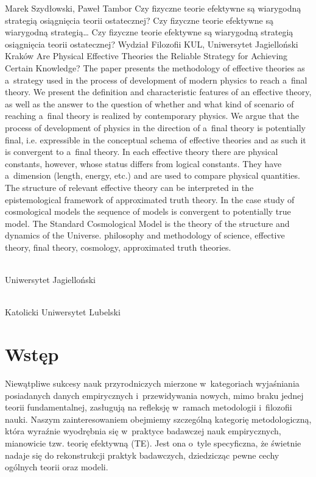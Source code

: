 \begin{artplenv2auth}{Marek Szydłowski, Paweł Tambor}
	{Czy fizyczne teorie efektywne są wiarygodną strategią osiągnięcia teorii ostatecznej?}
	{Czy fizyczne teorie efektywne są wiarygodną strategią\ldots}
	{Czy fizyczne teorie efektywne są wiarygodną strategią osiągnięcia teorii ostatecznej?}
	{Wydział Filozofii KUL, Uniwersytet Jagielloński Kraków}
	{Are Physical Effective Theories the Reliable Strategy for Achieving Certain Knowledge?}
	{The paper presents the methodology of effective theories as a~strategy used in the process of development of modern physics to reach a~final theory. We present the definition and characteristic features of an effective theory, as well as the answer to the question of whether and what kind of scenario of reaching a~final theory is realized by contemporary physics. We argue that the process of development of physics in the direction of a~final theory is potentially final, i.e. expressible in the conceptual schema of effective theories and as such it is convergent to a~final theory. In each effective theory there are physical constants, however, whose status differs from logical constants. They have a~dimension (length, energy, etc.) and are used to compare physical quantities. The structure of relevant effective theory can be interpreted in the epistemological framework of approximated truth theory. In the case study of cosmological models the sequence of models is convergent to potentially true model. The Standard Cosmological Model is the theory of the structure and dynamics of the Universe.}
	{philosophy and methodology of science, effective theory, final theory, cosmology, approximated truth theories.}
	{%
			{\flushright{}\\\subsubsectit\small{Uniwersytet Jagielloński}\par}%
			{\flushright{}\\\subsubsectit\small{Katolicki Uniwersytet Lubelski}\par}%
		}


\section{Wstęp}
\lettrine[loversize=0.13,lines=2,lraise=-0.04,nindent=0em,findent=0.2pt]%
{N}{}iewątpliwe sukcesy nauk przyrodniczych mierzone w~kategoriach wyjaśniania posiadanych danych empirycznych i~przewidywania nowych, mimo braku jednej teorii fundamentalnej, zasługują na refleksję w~ramach metodologii i~filozofii nauki. Naszym zainteresowaniem obejmiemy szczególną kategorię metodologiczną, która wyraźnie wyodrębnia się w~praktyce badawczej nauk empirycznych, mianowicie tzw. teorię efektywną (TE). Jest ona o~tyle specyficzna, że świetnie nadaje się do rekonstrukcji praktyk badawczych, dziedzicząc pewne cechy ogólnych teorii oraz modeli.


\end{artplenv2auth}
